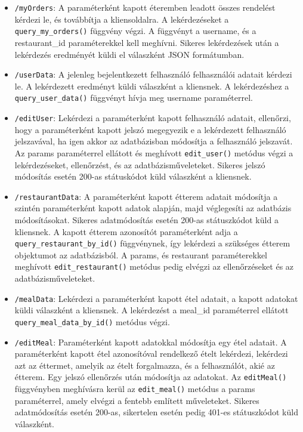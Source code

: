 \begin{itemize}
\item \texttt{/myOrders}:
A paraméterként kapott éteremben leadott összes rendelést kérdezi le, és továbbítja a kliensoldalra. A lekérdezéseket a \texttt{query\_my\_orders()} függvény végzi. A függvényt a username, és a restaurant\_id paraméterekkel kell meghívni. Sikeres lekérdezések után a lekérdezés eredményét küldi el válaszként JSON formátumban.
\item \texttt{/userData}:
A jelenleg bejelentkezett felhasználó felhasználói adatait kérdezi le. A lekérdezett eredményt küldi válaszként a kliensnek. A lekérdezéshez a \texttt{query\_user\_data()} függvényt hívja meg username paraméterrel.
\item \texttt{/editUser}:
Lekérdezi a paraméterként kapott felhasználó adatait, ellenőrzi, hogy a paraméterként kapott jelszó megegyezik e a lekérdezett felhasználó jelszavával, ha igen akkor az adatbázisban módosítja a felhasználó jelszavát. Az params paraméterrel ellátott és meghívott \texttt{edit\_user()} metódus végzi a lekérdezéseket, ellenőrzést, és az adatbázisműveleteket. Sikeres jelszó módosítás esetén 200-as státuskódot küld válaszként a kliensnek.
\item \texttt{/restaurantData}:
A paraméterként kapott étterem adatait módosítja a szintén paraméterként kapott adatok alapján, majd véglegesíti az adatbázis módosításokat. Sikeres adatmódosítás esetén 200-as státuszkódot küld a kliensnek. A kapott étterem azonosítót paraméterként adja a \texttt{query\_restaurant\_by\_id()} függvénynek, így lekérdezi a szükséges étterem objektumot az adatbázisból. A params, és restaurant paraméterekkel meghívott \texttt{edit\_restaurant()} metódus pedig elvégzi az ellenőrzéseket és az adatbázisműveleteket.
\item \texttt{/mealData}:
Lekérdezi a paraméterként kapott étel adatait, a kapott adatokat küldi válaszként a kliensnek. A lekérdezést a meal\_id paraméterrel ellátott \texttt{query\_meal\_data\_by\_id()} metódus végzi.
\item \texttt{/editMeal}:
Paraméterként kapott adatokkal módosítja egy étel adatait. A paraméterként kapott étel azonosítóval rendelkező ételt lekérdezi, lekérdezi azt az éttermet, amelyik az ételt forgalmazza, és a felhasználót, akié az étterem. Egy jelszó ellenőrzés után módosítja az adatokat. Az \texttt{editMeal()} függvényben meghívásra kerül az \texttt{edit\_meal()} metódus a params paraméterrel, amely elvégzi a fentebb említett műveleteket. Sikeres adatmódosítás esetén 200-as, sikertelen esetén pedig 401-es státuszkódot küld válaszként.

\end{itemize}
